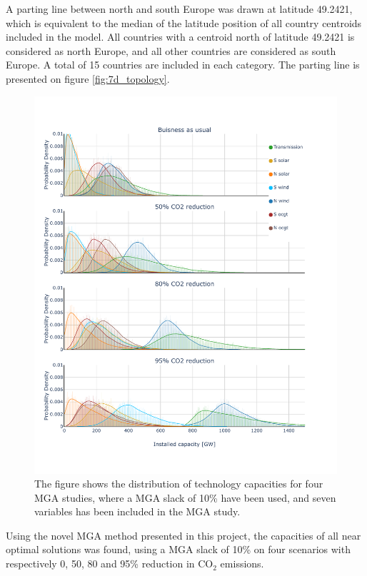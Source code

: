 A parting line between north and south Europe was drawn at latitude 49.2421, which is equivalent to the median of the latitude position of all country centroids included in the model. All countries with a centroid north of latitude 49.2421 is considered as north Europe, and all other countries are considered as south Europe. A total of 15 countries are included in each category. The parting line is presented on figure \ref{fig:7d_topology}. 

\begin{figure}[p]\centerfloat
	\includegraphics[width=1.3\textwidth,trim={0 1.7cm 0 0cm},clip]{./Images/7D_study_histogram}
	\caption{The figure shows the distribution of technology capacities for four MGA studies, where a MGA slack of 10\% have been used, and seven variables has been included in the MGA study. }
	\label{fig:7d_hist}
\end{figure}

Using the novel MGA method presented in this project, the capacities of all near optimal solutions was found, using a MGA slack of 10\% on four scenarios with respectively 0, 50, 80 and 95\% reduction in $\text{CO}_2$ emissions. 

